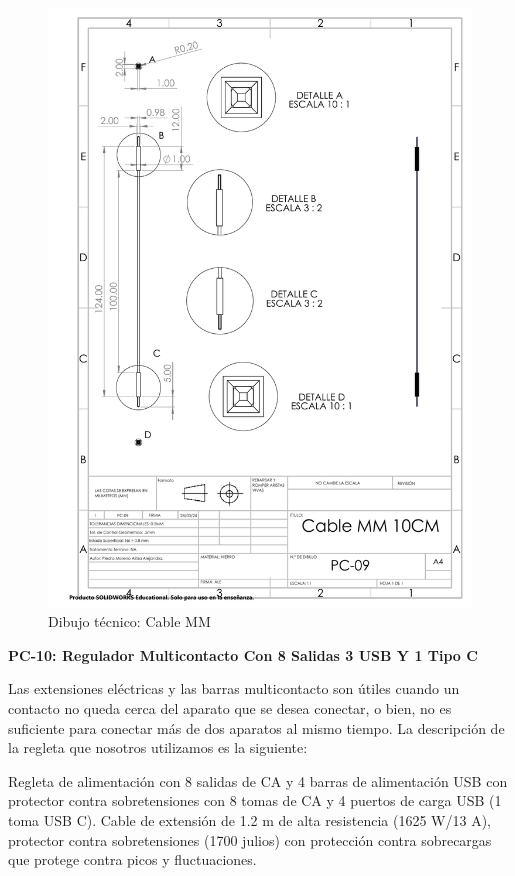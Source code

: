     \begin{figure}[H]
        \centering
        \includegraphics[trim = {7mm 1mm 1mm 1mm},clip,scale=0.4]{22/Img/cableMMDibujo.PDF}
        \caption{Dibujo técnico: Cable MM}
        \label{fig:Cable MM}
    \end{figure}
    
    \textbf{PC-10: Regulador Multicontacto Con 8 Salidas 3 USB Y 1 Tipo C }
    
    Las extensiones eléctricas y las barras multicontacto son útiles cuando un contacto no queda cerca del aparato que se desea conectar, o bien, no es suficiente para conectar más de dos aparatos al mismo tiempo.
    La descripción de la regleta que nosotros utilizamos es la siguiente:
    
    Regleta de alimentación con 8 salidas de CA y 4 barras de alimentación USB con protector contra sobretensiones con 8 tomas de CA y 4 puertos de carga USB (1 toma USB C). Cable de extensión de 1.2 m de alta resistencia (1625 W/13 A), protector contra sobretensiones (1700 julios) con protección contra sobrecargas que protege contra picos y fluctuaciones.
    
